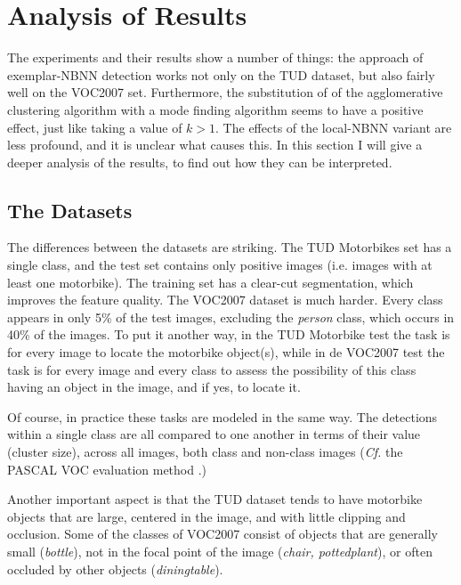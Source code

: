\section{Analysis of Results} %
\label{cha:analysis_of_results}


The experiments and their results show a number of things: the approach of exemplar-NBNN detection works not only on the TUD dataset, but also fairly well on the VOC2007 set. Furthermore, the substitution of of the agglomerative clustering algorithm with a mode finding algorithm seems to have a positive effect, just like taking a value of $k>1$. The effects of the local-NBNN variant are less profound, and it is unclear what causes this. In this section I will give a deeper analysis of the results, to find out how they can be interpreted.

\subsection{The Datasets} %
\label{sec:the_dataset}

The differences between the datasets are striking. The TUD Motorbikes set has a single class, and the test set contains only positive images (i.e. images with at least one motorbike). The training set has a clear-cut segmentation, which improves the feature quality. The VOC2007 dataset is much harder. Every class appears in only 5\% of the test images, excluding the \emph{person} class, which occurs in 40\% of the images. To put it another way, in the TUD Motorbike test the task is for every image to locate the motorbike object(s), while in de VOC2007 test the task is for every image and every class to assess the possibility of this class having an object in the image, and if yes, to locate it.

Of course, in practice these tasks are modeled in the same way. The detections within a single class are all compared to one another in terms of their value (cluster size), across all images, both class and non-class images (\emph{Cf.} the PASCAL VOC evaluation method \cite{pascal-voc-2007}.)

Another important aspect is that the TUD dataset tends to have motorbike objects that are large, centered in the image, and with little clipping and occlusion. Some of the classes of VOC2007 consist of objects that are generally small (\emph{bottle}), not in the focal point of the image (\emph{chair, pottedplant}), or often occluded by other objects (\emph{diningtable}).


